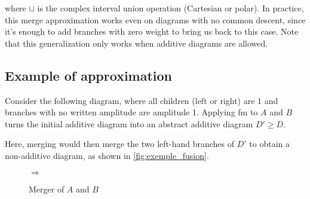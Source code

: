 \noindent where $\sqcup$ is the complex interval union operation (Cartesian or polar). In practice, this merge approximation works even on diagrams with no common descent, since it's enough to add branches with zero weight to bring us back to this case. Note that this generalization only works when additive diagrams are allowed.

\begin{multicols}{2}
  \section{Example of approximation}
  Consider the following diagram, where all children (left or right) are $\boxed 1$ and branches with no written amplitude are amplitude 1. Applying fm to $A$ and $B$ turns the initial additive diagram into an abstract additive diagram $D' \ge D$.

  Here, merging would then merge the two left-hand branches of $D'$ to obtain a non-additive diagram, as shown in \autoref{fig:exemple_fusion}.

  \columnbreak
  \begin{figure}[H]
    \centering
  $\Rightarrow$
  \caption{Merger of $A$ and $B$}
  \label{fig:exemple_fusion}
  \end{figure}

  \end{multicols}

